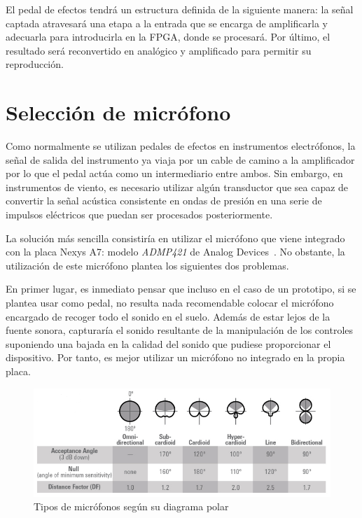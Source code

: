 El pedal de efectos tendrá un estructura definida de la siguiente manera: la señal captada atravesará una etapa a la entrada que se encarga de amplificarla y adecuarla para introducirla en la FPGA, donde se procesará. Por último, el resultado será reconvertido en analógico y amplificado para permitir su reproducción.

\section{Selección de micrófono}

Como normalmente se utilizan pedales de efectos en instrumentos electrófonos, la señal de salida del instrumento ya viaja por un cable de camino a la amplificador por lo que el pedal actúa como un intermediario entre ambos. Sin embargo, en instrumentos de viento, es necesario utilizar algún transductor que sea capaz de convertir la señal acústica consistente en ondas de presión en una serie de impulsos eléctricos que puedan ser procesados posteriormente.

La solución más sencilla consistiría en utilizar el micrófono que viene integrado con la placa Nexys A7: modelo \emph{ADMP421} de Analog Devices~\cite{Nexys}. No obstante, la utilización de este micrófono plantea los siguientes dos problemas.

En primer lugar, es inmediato pensar que incluso en el caso de un prototipo, si se plantea usar como pedal, no resulta nada recomendable colocar el micrófono encargado de recoger todo el sonido en el suelo. Además de estar lejos de la fuente sonora, capturaría el sonido resultante de la manipulación de los controles suponiendo una bajada en la calidad del sonido que pudiese proporcionar el dispositivo. Por tanto, es mejor utilizar un micrófono no integrado en la propia placa.

\begin{figure}
\begin{center}
\includegraphics[width=15cm]{img/micros.png}
\caption{\label{fig:polar_dig}Tipos de micrófonos según su diagrama polar~\cite{Mic}}
\end{center}
\end{figure}

